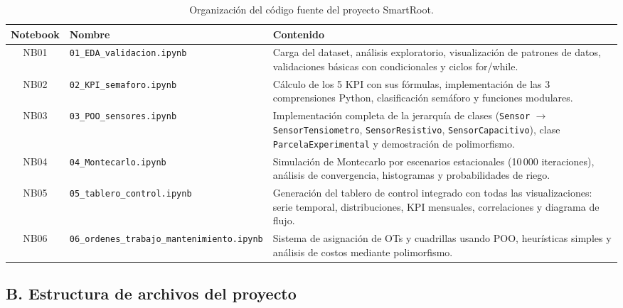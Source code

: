 \documentclass[12pt,a4paper]{article}
\begin{document}
\begin{table}[H]
\centering
\small
\caption{Organización del código fuente del proyecto SmartRoot.}
\begin{tabularx}{\textwidth}{@{}clX@{}}
\toprule
\textbf{Notebook} & \textbf{Nombre} & \textbf{Contenido} \\
\midrule
NB01 & \texttt{01\_EDA\_validacion.ipynb} & Carga del dataset, análisis exploratorio, visualización de patrones de datos, validaciones básicas con condicionales y ciclos for/while. \\[4pt]
NB02 & \texttt{02\_KPI\_semaforo.ipynb} & Cálculo de los 5 KPI con sus fórmulas, implementación de las 3 comprensiones Python, clasificación semáforo y funciones modulares. \\[4pt]
NB03 & \texttt{03\_POO\_sensores.ipynb} & Implementación completa de la jerarquía de clases (\texttt{Sensor} $\to$ \texttt{SensorTensiometro}, \texttt{SensorResistivo}, \texttt{SensorCapacitivo}), clase \texttt{ParcelaExperimental} y demostración de polimorfismo. \\[4pt]
NB04 & \texttt{04\_Montecarlo.ipynb} & Simulación de Montecarlo por escenarios estacionales (10\,000 iteraciones), análisis de convergencia, histogramas y probabilidades de riego. \\[4pt]
NB05 & \texttt{05\_tablero\_control.ipynb} & Generación del tablero de control integrado con todas las visualizaciones: serie temporal, distribuciones, KPI mensuales, correlaciones y diagrama de flujo. \\[4pt]
NB06 & \texttt{06\_ordenes\_trabajo\_mantenimiento.ipynb} & Sistema de asignación de OTs y cuadrillas usando POO, heurísticas simples y análisis de costos mediante polimorfismo. \\
\bottomrule
\end{tabularx}
\end{table}

\subsection*{B. Estructura de archivos del proyecto}
\end{document}
